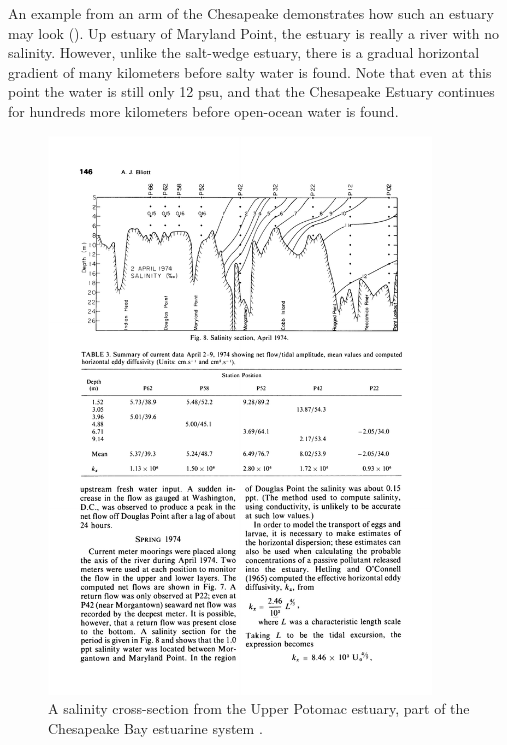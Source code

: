 An example from an arm of the Chesapeake demonstrates how such an estuary may look ().  Up estuary  of Maryland Point, the estuary is really a river with no salinity.  However, unlike the salt-wedge estuary, there is a gradual horizontal gradient of many kilometers before salty water is found.  Note that even at this point the water is still only 12 psu, and that the Chesapeake Estuary continues for hundreds more kilometers before open-ocean water is found.

\begin{figure}[htb]
  \centering
  \includegraphics[width=4in]{figs/Elliott76Fig8}
  \caption{A salinity cross-section from the Upper Potomac estuary,
    part of the Chesapeake Bay estuarine system \citep{elliott76}.}
  \label{fig:Elliott76Fig8}
\end{figure}

